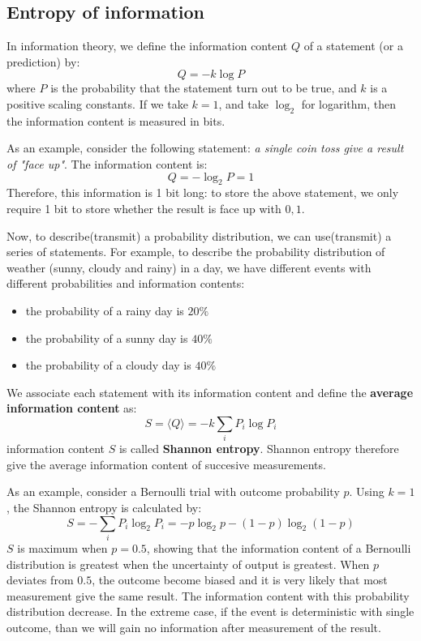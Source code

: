 \documentclass{article}
\begin{document}
\subsection{Entropy of information}
In information theory, we define the information content $Q$ of 
a statement (or a prediction) by:
\begin{equation}
    Q = - k \log P
\end{equation}
where $P$ is the probability that the statement turn out to be true, and
$k$ is a positive scaling constants. If we take $k = 1$, and take $\log_2$ for logarithm, then
the information content is measured in bits. 

As an example, consider the 
following statement: \emph{a single coin toss give a result of "face up"}. The 
information content is:
\begin{equation}
    Q = - \log_2 P = 1
\end{equation}
Therefore, this information is 1 bit long: to store the above statement, we only require 1 bit
to store whether the result is face up with ${0, 1}$.

Now, to describe(transmit) a probability distribution, we can use(transmit) a series of statements. For example, 
to describe the probability distribution of weather (sunny, cloudy and rainy) in a day, we 
have different events with different probabilities and information contents:
\begin{itemize}
    \item the probability of a rainy day is $20\%$
    \item the probability of a sunny day is $40\%$
    \item the probability of a cloudy day is $40\%$
\end{itemize}
We associate each statement with its information content and define the \textbf{average information content}
as:
\begin{equation}
    S = \langle Q \rangle = -k \sum_i P_i \log P_i
\end{equation}
information content $S$ is called \textbf{Shannon entropy}. Shannon entropy therefore give the average information
content of succesive measurements.

As an example, consider a Bernoulli trial with outcome probability $p$. Using $k=1$, the 
Shannon entropy is calculated by:
\begin{equation}
    S = - \sum_i P_i \log_2 P_i = -p \log_2 p - (1-p) \log_2 (1-p)
\end{equation}
$S$ is maximum when $p = 0.5$, showing that the information content of a Bernoulli distribution is greatest
when the uncertainty of output is greatest.
When $p$ deviates from $0.5$, the outcome become biased and it is very likely that most measurement
give the same result. The information content with this probability distribution decrease. In the extreme case, if the event is 
deterministic with single outcome, than we will gain no information after measurement of the result.
\end{document}
